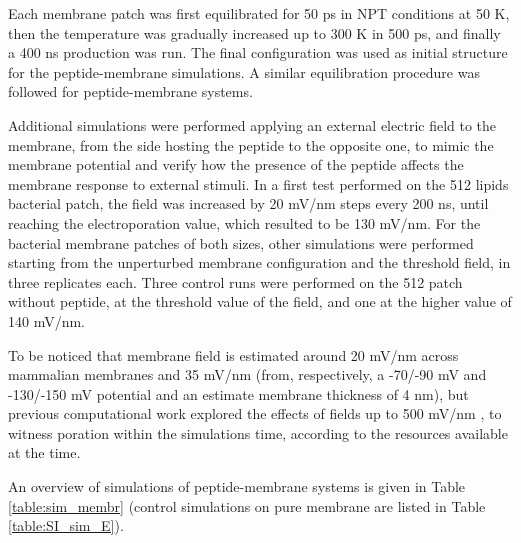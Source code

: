 Each membrane patch was first equilibrated for 50 ps in NPT conditions at 50 K, then the temperature was gradually increased up to 300 K in 500 ps, and finally a 400 ns production was run. The final configuration was used as initial structure for the peptide-membrane simulations. A similar equilibration procedure was followed for peptide-membrane systems.

Additional simulations were performed applying an external electric field to the membrane, from the side hosting the peptide to the opposite one, to mimic the membrane potential and verify how the presence of the peptide affects the membrane response to external stimuli.
%
In a first test performed on the 512 lipids bacterial patch, the field was increased by 20 mV/nm steps every 200 ns, until reaching the electroporation value, which resulted to be 130 mV/nm.
%
For the bacterial membrane patches of both sizes, other simulations were performed starting from the unperturbed membrane configuration and the threshold field, in three replicates each. Three control runs were performed on the 512 patch without peptide, at the threshold value of the field, and one at the higher value of 140 mV/nm.

To be noticed that membrane field is estimated around 20 mV/nm across mammalian membranes and 35 mV/nm (from, respectively, a -70/-90 mV and -130/-150 mV potential \cite{Wilson2011} and an estimate membrane thickness of 4 nm), but previous computational work explored the effects of fields up to 500 mV/nm \cite{Tieleman2004, Bockmann2008, Piggot2011}, to witness poration within the simulations time, according to the resources available at the time.

An overview of simulations of peptide-membrane systems is given in Table \ref{table:sim_membr} (control simulations on pure membrane are listed in Table \ref{table:SI_sim_E}).

